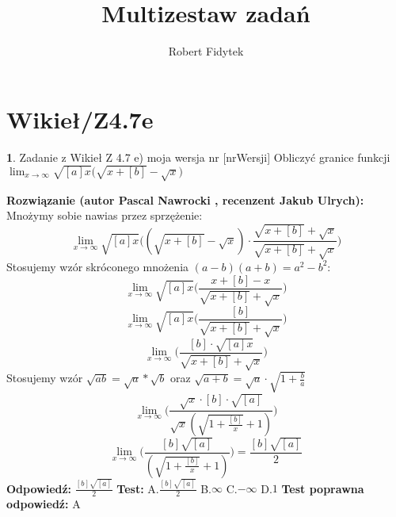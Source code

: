 \documentclass[12pt, a4paper]{article}
\title{Multizestaw zadań}
\author{Robert Fidytek}
\date{}
\theoremstyle{definition} %
\newtheorem{zad}{}
\newcommand{\kategoria}[1]{\section{#1}} %
\newcommand{\zadStart}[1]{\begin{zad}#1\newline} %
\newcommand{\zadStop}{\end{zad}}   %
\newcommand{\rozwStart}[2]{\noindent \textbf{Rozwiązanie (autor #1 , recenzent #2): }\newline} %
\newcommand{\rozwStop}{\newline}                                            %
\newcommand{\odpStart}{\noindent \textbf{Odpowiedź:}\newline}    %
\newcommand{\odpStop}{\newline}                                             %
\newcommand{\testStart}{\noindent \textbf{Test:}\newline} %
\newcommand{\testStop}{\newline} %
\newcommand{\kluczStart}{\noindent \textbf{Test poprawna odpowiedź:}\newline} %
\newcommand{\kluczStop}{\newline} %
\begin{document}
\maketitle


\kategoria{Wikieł/Z4.7e}
\zadStart{Zadanie z Wikieł Z 4.7 e) moja wersja nr [nrWersji]}
Obliczyć granice funkcji $\displaystyle{\lim_{x \to \infty}}\sqrt{[a]x}\big(\sqrt{x+[b]}-\sqrt{x}\big)$
\zadStop
\rozwStart{Pascal Nawrocki}{Jakub Ulrych}
Mnożymy sobie nawias przez sprzężenie:
$$\displaystyle{\lim_{x \to \infty}}\sqrt{[a]x}\big((\sqrt{x+[b]}-\sqrt{x})\cdot\frac{\sqrt{x+[b]}+\sqrt{x}}{\sqrt{x+[b]}+\sqrt{x}}\big)$$
Stosujemy wzór skróconego mnożenia $(a-b)(a+b)=a^2-b^2$:
$$\displaystyle{\lim_{x \to \infty}}\sqrt{[a]x}\bigg(\frac{x+[b]-x}{\sqrt{x+[b]}+\sqrt{x}}\bigg)$$
$$\displaystyle{\lim_{x \to \infty}}\sqrt{[a]x}\bigg(\frac{[b]}{\sqrt{x+[b]}+\sqrt{x}}\bigg)$$
$$\displaystyle{\lim_{x \to \infty}}\bigg(\frac{[b]\cdot\sqrt{[a]x}}{\sqrt{x+[b]}+\sqrt{x}}\bigg)$$
Stosujemy wzór $\sqrt{ab}=\sqrt{a}*\sqrt{b}$ oraz $\sqrt{a+b}=\sqrt{a}\cdot\sqrt{1+\frac{b}{a}}$
$$\displaystyle{\lim_{x \to \infty}}\bigg(\frac{\sqrt{x}\cdot[b]\cdot\sqrt{[a]}}{\sqrt{x}(\sqrt{1+\frac{[b]}{x}}+1)}\bigg)$$
$$\displaystyle{\lim_{x \to \infty}}\bigg(\frac{[b]\sqrt{[a]}}{(\sqrt{1+\frac{[b]}{x}}+1)}\bigg)=\frac{[b]\sqrt{[a]}}{2}$$
\rozwStop
\odpStart
$\frac{[b]\sqrt{[a]}}{2}$
\odpStop
\testStart
A.$\frac{[b]\sqrt{[a]}}{2}$
B.$\infty$
C.$-\infty$
D.$1$
\testStop
\kluczStart
A
\kluczStop
\end{document}
